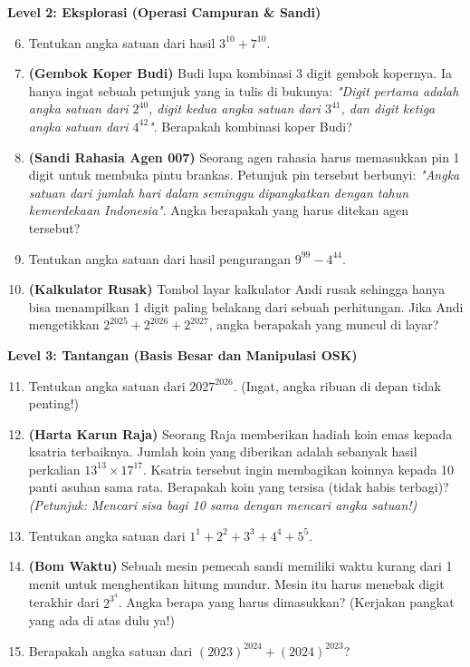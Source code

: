 \documentclass[11pt,a4paper]{article}
\begin{document}
\textbf{Level 2: Eksplorasi (Operasi Campuran \& Sandi)}
\begin{enumerate}
    \setcounter{enumi}{5}
    \item Tentukan angka satuan dari hasil $3^{10} + 7^{10}$.
    \item \textbf{(Gembok Koper Budi)} Budi lupa kombinasi 3 digit gembok kopernya. Ia hanya ingat sebuah petunjuk yang ia tulis di bukunya: \textit{"Digit pertama adalah angka satuan dari $2^{40}$, digit kedua angka satuan dari $3^{41}$, dan digit ketiga angka satuan dari $4^{42}$"}. Berapakah kombinasi koper Budi?
    \item \textbf{(Sandi Rahasia Agen 007)} Seorang agen rahasia harus memasukkan pin 1 digit untuk membuka pintu brankas. Petunjuk pin tersebut berbunyi: \textit{"Angka satuan dari jumlah hari dalam seminggu dipangkatkan dengan tahun kemerdekaan Indonesia"}. Angka berapakah yang harus ditekan agen tersebut?
    \item Tentukan angka satuan dari hasil pengurangan $9^{99} - 4^{44}$.
    \item \textbf{(Kalkulator Rusak)} Tombol layar kalkulator Andi rusak sehingga hanya bisa menampilkan 1 digit paling belakang dari sebuah perhitungan. Jika Andi mengetikkan $2^{2025} + 2^{2026} + 2^{2027}$, angka berapakah yang muncul di layar?
\end{enumerate}

\textbf{Level 3: Tantangan (Basis Besar dan Manipulasi OSK)}
\begin{enumerate}
    \setcounter{enumi}{10}
    \item Tentukan angka satuan dari $2027^{2026}$. (Ingat, angka ribuan di depan tidak penting!)
    \item \textbf{(Harta Karun Raja)} Seorang Raja memberikan hadiah koin emas kepada ksatria terbaiknya. Jumlah koin yang diberikan adalah sebanyak hasil perkalian $13^{13} \times 17^{17}$. Ksatria tersebut ingin membagikan koinnya kepada 10 panti asuhan sama rata. Berapakah koin yang tersisa (tidak habis terbagi)? \textit{(Petunjuk: Mencari sisa bagi 10 sama dengan mencari angka satuan!)}
    \item Tentukan angka satuan dari $1^1 + 2^2 + 3^3 + 4^4 + 5^5$.
    \item \textbf{(Bom Waktu)} Sebuah mesin pemecah sandi memiliki waktu kurang dari 1 menit untuk menghentikan hitung mundur. Mesin itu harus menebak digit terakhir dari $2^{3^4}$. Angka berapa yang harus dimasukkan? (Kerjakan pangkat yang ada di atas dulu ya!)
    \item Berapakah angka satuan dari $(2023)^{2024} + (2024)^{2023}$?
\end{enumerate}
\end{document}
